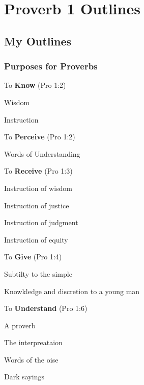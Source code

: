 \section{Proverb 1 Outlines}

\subsection{My Outlines}

\subsubsection{Purposes for Proverbs}

\begin{compactenum}[I.][7]

	\item To \textbf{Know}  (Pro 1:2)
	\begin{compactenum}[A.]
		\item Wisdom
		\item Instruction
	\end{compactenum}
	\item To \textbf{Perceive}  (Pro 1:2)
	\begin{compactenum}[A.]
		\item Words of Understanding
	\end{compactenum}
	\item To \textbf{Receive}  (Pro 1:3)
	\begin{compactenum}[A.]
		\item Instruction of wisdom
		\item Instruction of justice
		\item Instruction of judgment
		\item Instruction of equity
	\end{compactenum}
	\item To \textbf{Give}  (Pro 1:4)
	\begin{compactenum}[A.]
		\item Subtilty to the simple
		\item Knowkledge and discretion to a young man
	\end{compactenum}
	\item To \textbf{Understand}  (Pro 1:6)
	\begin{compactenum}[A.]
		\item A proverb
		\item The interpreataion
		\item Words of the oise
		\item Dark sayings
	\end{compactenum}
\end{compactenum} 


